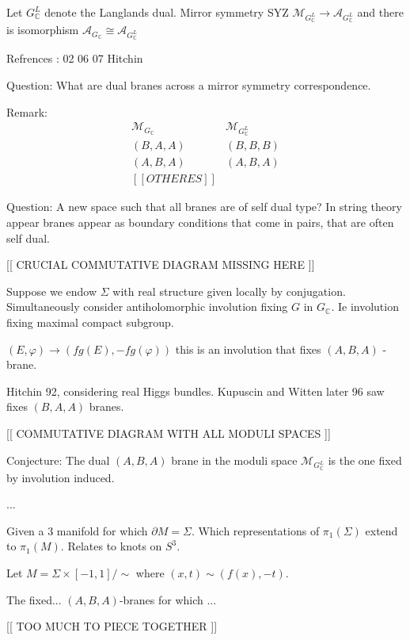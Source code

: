 Let $ G_\mathbb{C} ^L $ denote the Langlands dual. 
Mirror symmetry SYZ 
$\mathcal{M} _{G_\mathbb{C}  ^L } \rightarrow \mathcal{A} _{G_\mathbb{C}  ^L } $ 
and there is isomorphism $\mathcal{A} _{G_\mathbb{C}  } \cong \mathcal{A} _{G_\mathbb{C}  ^L } $ 

Refrences : 
02 
06 
07 
Hitchin 

Question: 
What are dual branes across a mirror symmetry correspondence. 

Remark: 
\begin{align}
    \mathcal{M} _ {G_\mathbb{C} } & \mathcal{M} _ {G_\mathbb{C} ^L } \\
    (B, A, A) & (B,B,B) \\
    (A, B, A) & (A,B,A) \\
    [[ OTHERES ]] 
\end{align}

Question: A new space such that all branes are of self dual type?
In string theory appear branes appear as boundary conditions that come in pairs, 
that are often self dual. 

[[ CRUCIAL COMMUTATIVE DIAGRAM MISSING HERE ]] 

Suppose we endow $\Sigma $ with real structure given locally by conjugation.
Simultaneously consider antiholomorphic involution fixing $G$ in $G_\mathbb{C} $. 
Ie involution fixing maximal compact subgroup. 

$( E, \varphi) \rightarrow (fg(E), -fg(\varphi)) $ 
this is an involution that fixes $(A,B,A)$ -brane.

Hitchin 92, considering real Higgs bundles.
Kupuscin and Witten later 96 saw fixes $(B,A,A)$ branes. 


[[ COMMUTATIVE DIAGRAM WITH ALL MODULI SPACES  ]] 

Conjecture: 
The dual $(A,B,A)$ brane in the moduli space $ \mathcal{M}_{G_\mathbb{C}  ^L} $ 
is the one fixed by involution induced.

\begin{theorem}
...
\end{theorem}

Given a 3 manifold for which $ \partial M = \Sigma$. 
Which representations of $ \pi_1 ( \Sigma) $ extend to $ \pi_1 (M)$.
Relates to knots on $S^3$. 

Let $ M = \Sigma \times [-1, 1] /\sim  $ where $ (x,t) \sim (f(x) , -t) $. 

\begin{theorem}
    The fixed... $(A,B,A)$-branes 
    for which ... 
\end{theorem}

[[ TOO MUCH TO PIECE TOGETHER ]] 





 

